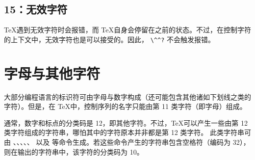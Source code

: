 \documentclass{book}
\begin{document}
\subsection{15：无效字符}

\TeX 遇到无效字符时会报错，而 \TeX 自身会停留在之前的状态。不过，在控制字符的上下文中，无效字符也是可以接受的。因此， \verb>\^^?> 不会触发报错。

\section{字母与其他字符}
\label{cat12}

大部分编程语言的标识符可由字母与数字构成（还可能包含其他诸如下划线之类的字符）。但是，在 \TeX 中，控制序列的名字只能由第 11 类字符（即字母）组成。

通常，数字和标点的分类码是 12，即其他字符。不过，\TeX 可以产生一些由第 12 类字符组成的字符串，哪怕其中的字符原本并非都是第 12 类字符。
此类字符串可由 、、、、、 以及  等命令生成。若这些命令产生的字符串包含空格符（\ascii 编码为 32），则在输出的字符串中，该字符的分类码为 10。
\end{document}
